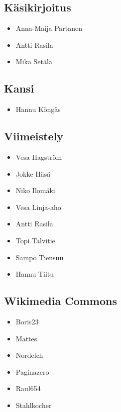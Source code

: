 \subsection*{Käsikirjoitus}
\begin{itemize}
\item Anna-Maija Partanen
\item Antti Rasila
\item Mika Setälä
\end{itemize}

\subsection*{Kansi}
\begin{itemize}
\item Hannu Köngäs
\end{itemize}

\subsection*{Viimeistely}
\begin{itemize}
\item Vesa Hagström
\item Jokke Häsä
\item Niko Ilomäki
\item Vesa Linja-aho
\item Antti Rasila
\item Topi Talvitie
\item Sampo Tiensuu
\item Hannu Tiitu
\end{itemize}

\subsection*{Wikimedia Commons}
\begin{itemize}
\item Boris23
\item Mattes
\item Nordelch
\item Paginazero
\item Raul654
\item Stahlkocher
\end{itemize}
